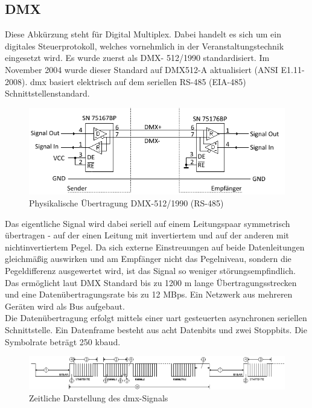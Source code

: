 \documentclass[11pt]{scrartcl}
\begin{document}
\subsection{DMX}
Diese Abkürzung steht für Digital Multiplex. Dabei handelt es sich um ein digitales Steuerprotokoll,
welches vornehmlich in der Veranstaltungstechnik eingesetzt wird. Es wurde zuerst als DMX-
512/1990 standardisiert. Im November 2004 wurde dieser Standard auf DMX512-A aktualisiert
(ANSI E1.11-2008). \ac{dmx} basiert elektrisch auf dem seriellen RS-485 (EIA-485)
Schnittstellenstandard.
\begin{figure}[H]
    \begin{center}
        \includegraphics[width=.75\textwidth]{images/dmx.png}
    \end{center}
    \vspace{-.5cm}
    \caption[Physikalische Übertragung DMX-512/1990 (RS-485)]{Physikalische Übertragung DMX-512/1990 (RS-485) \cite{soundlight}}
\end{figure}
\vspace{-.3cm}
\noindent
Das eigentliche Signal wird dabei seriell auf einem Leitungspaar symmetrisch übertragen - auf der
einen Leitung mit invertiertem und auf der anderen mit nichtinvertiertem Pegel. Da sich externe 
Einstreuungen auf beide Datenleitungen gleichmäßig auswirken und am Empfänger nicht das Pegelniveau,
sondern die Pegeldifferenz ausgewertet wird, ist das Signal so weniger störungsempfindlich.
Das ermöglicht laut DMX Standard \cite{dmxstandard} bis zu 1200 m lange Übertragungsstrecken und eine
Datenübertragungsrate bis zu 12 \ac{MBps}. Ein Netzwerk aus mehreren Geräten wird als Bus aufgebaut.\\
Die Datenübertragung erfolgt mittels einer \ac{uart} gesteuerten asynchronen seriellen Schnittstelle. Ein
Datenframe besteht aus acht Datenbits und zwei Stoppbits. Die Symbolrate beträgt 250 k\ac{baud}.
\begin{figure}[H]
    \includegraphics[width=\textwidth]{images/DMX_zeitlich.png}
    \caption[Zeitliche Darstellung des DMX-Signals]{Zeitliche Darstellung des \ac{dmx}-Signals \cite{soundlightA}} \label{fig:DMXoverTime}
\end{figure}
\end{document}
